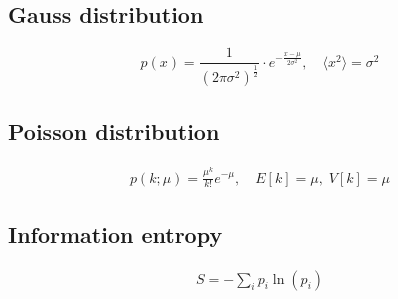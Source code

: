 \subsection*{Gauss distribution}

\[
        p(x) = \frac{1}{\left(2 \pi \sigma^2\right)^{\frac{1}{2}}} \cdot e^{-\frac{x-\mu}{2 \sigma^2}}, \quad \langle x^2 \rangle = \sigma^2
\]

\subsection*{Poisson distribution}

\[
    \begin{aligned}
        p(k; \mu) = \frac{\mu^k}{k!} e^{- \mu}, \quad E[k] = \mu, \; V[k] = \mu
    \end{aligned}
\]

\subsection*{Information entropy}
\[
    \begin{aligned}
        S = - \sum_i p_i \ln (p_i)
    \end{aligned}
\]